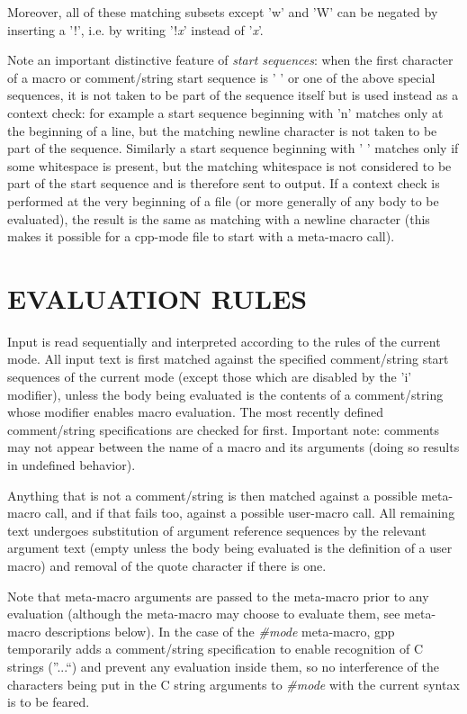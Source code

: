 Moreover, all of these matching subsets except '{\htmlBackslash}w' and
'{\htmlBackslash}W' can be negated by inserting a '!', i.e. by writing
'{\htmlBackslash}!{\it x}' instead of '{\htmlBackslash}{\it x}'. 

Note an important distinctive feature of {\it start sequences}: when the first
character of a macro or comment/string start sequence is ' ' or one of the
above special sequences, it is not taken to be part of the sequence itself but
is used instead as a context check: for example a start sequence beginning
with '{\htmlBackslash}n' matches only at the beginning of a line, but the
matching newline character is not taken to be part of the sequence. Similarly
a start sequence beginning with ' ' matches only if some whitespace is
present, but the matching whitespace is not considered to be part of the start
sequence and is therefore sent to output. If a context check is performed at
the very beginning of a file (or more generally of any body to be evaluated),
the result is the same as matching with a newline character (this makes it
possible for a cpp-mode file to start with a meta-macro call). 

\htmlHR

\section{EVALUATION RULES}

Input is read sequentially and interpreted according to the rules of the
current mode. All input text is first matched against the specified
comment/string start sequences of the current mode (except those which are
disabled by the 'i' modifier), unless the body being evaluated is the contents
of a comment/string whose modifier enables macro evaluation. The most recently
defined comment/string specifications are checked for first. Important note:
comments may not appear between the name of a macro and its arguments (doing
so results in undefined behavior). 

Anything that is not a comment/string is then matched against a possible
meta-macro call, and if that fails too, against a possible user-macro call.
All remaining text undergoes substitution of argument reference sequences by
the relevant argument text (empty unless the body being evaluated is the
definition of a user macro) and removal of the quote character if there is
one. 

Note that meta-macro arguments are passed to the meta-macro prior to any
evaluation (although the meta-macro may choose to evaluate them, see
meta-macro descriptions below). In the case of the {\it \#mode} meta-macro,
gpp temporarily adds a comment/string specification to enable recognition of C
strings (''...``) and prevent any evaluation inside them, so no interference
of the characters being put in the C string arguments to {\it \#mode} with the
current syntax is to be feared. 

